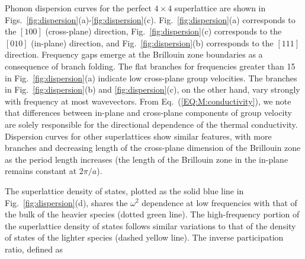 \documentclass[aps,prb,preprint,preprintnumbers,amsmath,amssymb,floatfix,superscriptaddress]{revtex4}
\begin{document}
Phonon dispersion curves for the perfect $4\times4$ superlattice are shown in Figs.~\ref{fig:dispersion}(a)-\ref{fig:dispersion}(c). Fig.~\ref{fig:dispersion}(a) corresponds to the $[1 0 0]$ (cross-plane) direction, Fig.~\ref{fig:dispersion}(c) corresponds to the $[0 1 0]$ (in-plane) direction, and Fig.~\ref{fig:dispersion}(b) corresponds to the $[1 1 1]$ direction. Frequency gaps emerge at the Brillouin zone boundaries as a consequence of branch folding.\cite{PhysRevB.38.1427,PhysRevB.60.2627} The flat branches for frequencies greater than 15 in Fig.~\ref{fig:dispersion}(a) indicate low cross-plane group velocities. The branches in Fig.~\ref{fig:dispersion}(b) and \ref{fig:dispersion}(c), on the other hand, vary strongly with frequency at most wavevectors. From Eq.~(\ref{EQ:M:conductivity}), we note that differences between in-plane and cross-plane components of group velocity are solely responsible for the directional dependence of the thermal conductivity.  Dispersion curves for other superlattices show similar features, with more branches and decreasing length of the cross-plane dimension of the Brillouin zone as the period length increases (the length of the Brillouin zone in the in-plane remains constant at $2\pi/a$).
\renewcommand{\topfraction}{0.7}
\begin{figure*}%
\begin{center}
\renewcommand{\figure}{Fig.}
\caption{(a),(b),(c) Dispersion, (d) density of states and (e) inverse participation ratio for a $4\times4$ superlattice. Labeled gray squares represent select modes for Fig.~\ref{fig:sed}.}%
\label{fig:dispersion}
\end{center}
\end{figure*}
The superlattice density of states, plotted as the solid blue line in Fig.~\ref{fig:dispersion}(d), shares the $\omega^2$ dependence at low frequencies with that of the bulk of the heavier species (dotted green line). The high-frequency portion of the superlattice density of states follows similar variations to that of the density of states of the lighter species (dashed yellow line). The inverse participation ratio, defined as\cite{PhysRevB.70.235214}
\end{document}
